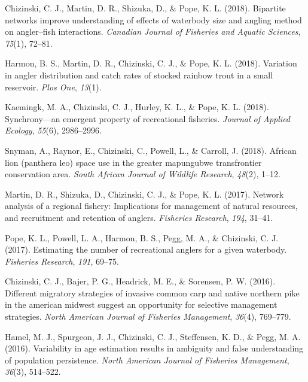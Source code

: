 \documentclass[
  12pt,
]
{article}
\newlength{\cslhangindent}
\newlength{\cslentryspacingunit} %
\newenvironment{CSLReferences}[2] %
 {%
  \setlength{\parindent}{0pt}
  \ifodd #1
  \let\oldpar\par
  \def\par{\hangindent=\cslhangindent\oldpar}
  \fi
  \setlength{\parskip}{#2\cslentryspacingunit}
 }%
 {}
\begin{document}
\begin{CSLReferences}{1}{0}
\leavevmode{}%
Chizinski, C. J., Martin, D. R., Shizuka, D., \& Pope, K. L. (2018).
Bipartite networks improve understanding of effects of waterbody size
and angling method on angler--fish interactions. \emph{Canadian Journal
of Fisheries and Aquatic Sciences}, \emph{75}(1), 72--81.

\leavevmode{}%
Harmon, B. S., Martin, D. R., Chizinski, C. J., \& Pope, K. L. (2018).
Variation in angler distribution and catch rates of stocked rainbow
trout in a small reservoir. \emph{Plos One}, \emph{13}(1).

\leavevmode{}%
Kaemingk, M. A., Chizinski, C. J., Hurley, K. L., \& Pope, K. L. (2018).
Synchrony---an emergent property of recreational fisheries.
\emph{Journal of Applied Ecology}, \emph{55}(6), 2986--2996.

\leavevmode{}%
Snyman, A., Raynor, E., Chizinski, C., Powell, L., \& Carroll, J.
(2018). African lion (panthera leo) space use in the greater mapungubwe
transfrontier conservation area. \emph{South African Journal of Wildlife
Research}, \emph{48}(2), 1--12.

\leavevmode{}%
Martin, D. R., Shizuka, D., Chizinski, C. J., \& Pope, K. L. (2017).
Network analysis of a regional fishery: Implications for management of
natural resources, and recruitment and retention of anglers.
\emph{Fisheries Research}, \emph{194}, 31--41.

\leavevmode{}%
Pope, K. L., Powell, L. A., Harmon, B. S., Pegg, M. A., \& Chizinski, C.
J. (2017). Estimating the number of recreational anglers for a given
waterbody. \emph{Fisheries Research}, \emph{191}, 69--75.

\leavevmode{}%
Chizinski, C. J., Bajer, P. G., Headrick, M. E., \& Sorensen, P. W.
(2016). Different migratory strategies of invasive common carp and
native northern pike in the american midwest suggest an opportunity for
selective management strategies. \emph{North American Journal of
Fisheries Management}, \emph{36}(4), 769--779.

\leavevmode{}%
Hamel, M. J., Spurgeon, J. J., Chizinski, C. J., Steffensen, K. D., \&
Pegg, M. A. (2016). Variability in age estimation results in ambiguity
and false understanding of population persistence. \emph{North American
Journal of Fisheries Management}, \emph{36}(3), 514--522.


\end{CSLReferences}
\end{document}
